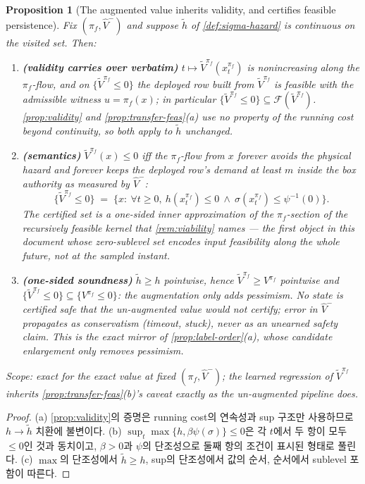 \documentclass[11pt]{article}
\theoremstyle{plain}
\newtheorem{proposition}[theorem]{Proposition}
\theoremstyle{definition}
\theoremstyle{remark}
\newcommand{\Vhat}{\widehat V}
\begin{document}
\begin{proposition}[The augmented value inherits validity, and certifies feasible persistence]\label{prop:sigma-valid}
Fix $(\pi_f,\Vhat^-)$ and suppose $\tilde h$ of \cref{def:sigma-hazard} is continuous on the
visited set. Then:
\begin{enumerate}[label=(\alph*)]
\item \textbf{(validity carries over verbatim)} $t\mapsto\tilde V^{\pi_f}(x^{\pi_f}_t)$ is
nonincreasing along the $\pi_f$-flow, and on $\{\tilde V^{\pi_f}\le0\}$ the deployed row built
from $\tilde V^{\pi_f}$ is feasible with the admissible witness $u=\pi_f(x)$; in particular
$\{\tilde V^{\pi_f}\le0\}\subseteq\mathcal F(\tilde V^{\pi_f})$. \cref{prop:validity} and
\cref{prop:transfer-feas}(a) use no property of the running cost beyond continuity, so both
apply to $\tilde h$ unchanged.
\item \textbf{(semantics)} $\tilde V^{\pi_f}(x)\le0$ iff the $\pi_f$-flow from $x$ forever
avoids the physical hazard \emph{and} forever keeps the deployed row's demand at least $m$
inside the box authority as measured by $\Vhat^-$:
\[
  \{\tilde V^{\pi_f}\le0\}
  \;=\;\bigl\{x:\ \forall t\ge0,\ h(x^{\pi_f}_t)\le0\ \wedge\ \sigma(x^{\pi_f}_t)\le\psi^{-1}(0)\bigr\}.
\]
The certified set is a one-sided inner approximation of the $\pi_f$-section of the recursively
feasible kernel that \cref{rem:viability} names --- the first object in this document whose
zero-sublevel set encodes input feasibility \emph{along the whole future}, not at the sampled
instant.
\item \textbf{(one-sided soundness)} $\tilde h\ge h$ pointwise, hence
$\tilde V^{\pi_f}\ge V^{\pi_f}$ pointwise and
$\{\tilde V^{\pi_f}\le0\}\subseteq\{V^{\pi_f}\le0\}$: the augmentation only \emph{adds}
pessimism. No state is certified safe that the un-augmented value would not certify; error in
$\Vhat^-$ propagates as conservatism (timeout, stuck), never as an unearned safety claim. This
is the exact mirror of \cref{prop:label-order}(a), whose candidate enlargement only
\emph{removes} pessimism.
\end{enumerate}
Scope: exact for the exact value at fixed $(\pi_f,\Vhat^-)$; the learned regression of
$\tilde V^{\pi_f}$ inherits \cref{prop:transfer-feas}(b)'s caveat exactly as the un-augmented
pipeline does.
\end{proposition}
\begin{proof}
(a) \cref{prop:validity}의 증명은 running cost의 연속성과 sup 구조만 사용하므로 $h\to\tilde h$
치환에 불변이다. (b) $\sup_t\max\{h,\beta\psi(\sigma)\}\le0$은 각 $t$에서 두 항이 모두
$\le0$인 것과 동치이고, $\beta>0$과 $\psi$의 단조성으로 둘째 항의 조건이 표시된 형태로
풀린다. (c) $\max$의 단조성에서 $\tilde h\ge h$, sup의 단조성에서 값의 순서, 순서에서
sublevel 포함이 따른다.
\end{proof}
\end{document}
